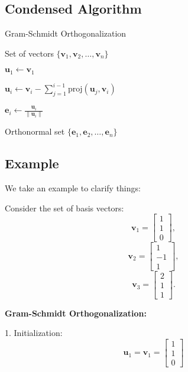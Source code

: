 \subsection{Condensed Algorithm}

\begin{algorithm}
\caption{Gram-Schmidt Orthogonalization}
\begin{algorithmic}[1]

\Require Set of vectors $\{\mathbf{v}_1, \mathbf{v}_2, \ldots, \mathbf{v}_n\}$

\State $\mathbf{u}_1 \gets \mathbf{v}_1$

    \State $\mathbf{u}_i \gets \mathbf{v}_i - \sum_{j=1}^{i-1} \text{proj}(\mathbf{u}_j, \mathbf{v}_i)$
\EndFor

    \State $\mathbf{e}_i \gets \frac{\mathbf{u}_i}{\|\mathbf{u}_i\|}$
\EndFor

\Ensure Orthonormal set $\{\mathbf{e}_1, \mathbf{e}_2, \ldots, \mathbf{e}_n\}$

\end{algorithmic}
\end{algorithm}


\subsection{Example}

We take an example to clarify things:

Consider the set of basis vectors: 
\[ \mathbf{v}_1 = \begin{bmatrix} 1 \\ 1 \\ 0 \end{bmatrix}, \]
\[ \mathbf{v}_2 = \begin{bmatrix} 1 \\ -1 \\ 1 \end{bmatrix}, \]
\[ \mathbf{v}_3 = \begin{bmatrix} 2 \\ 1 \\ 1 \end{bmatrix}. \]

\textbf{Gram-Schmidt Orthogonalization:}

1. Initialization:
   \[ \mathbf{u}_1 = \mathbf{v}_1 = \begin{bmatrix} 1 \\ 1 \\ 0 \end{bmatrix} \]

